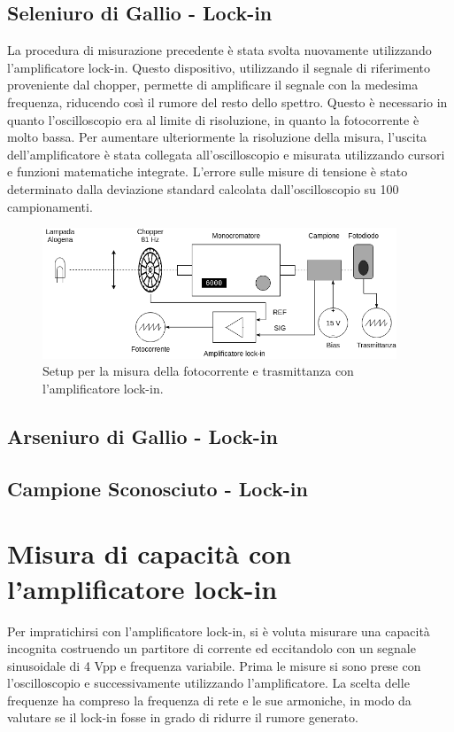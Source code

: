 \documentclass[11pt]{article} %
\begin{document}
\subsection{Seleniuro di Gallio - Lock-in}
La procedura di misurazione precedente è stata svolta nuovamente utilizzando l'amplificatore lock-in. Questo dispositivo, utilizzando il segnale di riferimento proveniente dal chopper, permette di amplificare il segnale con la medesima frequenza, riducendo così il rumore del resto dello spettro. Questo è necessario in quanto l'oscilloscopio era al limite di risoluzione, in quanto la fotocorrente è molto bassa. Per aumentare ulteriormente la risoluzione della misura, l'uscita dell'amplificatore è stata collegata all'oscilloscopio e misurata utilizzando cursori e funzioni matematiche integrate. L'errore sulle misure di tensione è stato determinato dalla deviazione standard calcolata dall'oscilloscopio su 100 campionamenti.
\begin{figure}[h!]
\begin{center}
\includegraphics[width=400px]{img/foto_lock.png}
\caption{Setup per la misura della fotocorrente e trasmittanza con l'amplificatore lock-in.}
\end{center}
\end{figure}
\subsection{Arseniuro di Gallio - Lock-in}

\subsection{Campione Sconosciuto - Lock-in}

\appendix
\section{Misura di capacità con l'amplificatore lock-in}
Per impratichirsi con l'amplificatore lock-in, si è voluta misurare una capacità incognita costruendo un partitore di corrente ed eccitandolo con un segnale sinusoidale di 4 Vpp e frequenza variabile. Prima le misure si sono prese con l'oscilloscopio e successivamente utilizzando l'amplificatore. La scelta delle frequenze ha compreso la frequenza di rete e le sue armoniche, in modo da valutare se il lock-in fosse in grado di ridurre il rumore generato.
\end{document}
